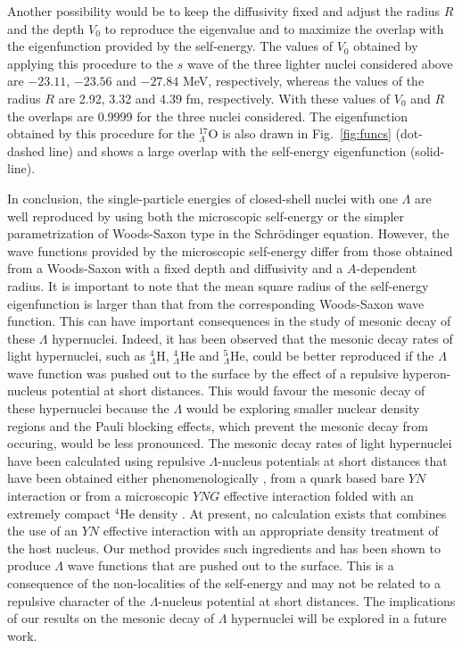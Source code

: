Another possibility would be to keep the diffusivity fixed and
adjust the radius $R$ and the depth $V_0$ to reproduce the eigenvalue and to
maximize
the overlap with the eigenfunction provided by the self-energy.  The
values of $V_0$ obtained 
by applying this procedure to the $s$ wave of the three lighter
nuclei considered 
 above are $-23.11$, $-23.56$ and $-27.84$ MeV, respectively, 
whereas the values of the radius $R$ are 2.92, 3.32 and 4.39 fm,
respectively.  With these values
of $V_0$ and $R$ the overlaps are 0.9999 for the three nuclei
considered. The eigenfunction obtained by this procedure for
 the $^{17}_{\Lambda}$O is
also drawn in Fig.\ \ref{fig:funcs} (dot-dashed line) and shows a
large overlap with the self-energy eigenfunction (solid-line).

In conclusion, the single-particle energies of closed-shell nuclei
with one $\Lambda$ are well reproduced 
by using both the microscopic self-energy or the simpler
parametrization of
 Woods-Saxon type in the Schr\"odinger equation. However, the wave
functions provided by the microscopic self-energy differ from those
obtained from a Woods-Saxon with a fixed depth and diffusivity and
a $A$-dependent radius. It is important to note that the mean square radius of the
self-energy eigenfunction is larger than that from the corresponding
Woods-Saxon wave function. This can have important consequences in 
the study of mesonic decay of these $\Lambda$ hypernuclei.
Indeed, it has been observed that the mesonic decay rates 
of light hypernuclei,
such as $^4_\Lambda$H, $^4_\Lambda$He and $^5_\Lambda$He, could be
better reproduced if the 
$\Lambda$ wave function was pushed out to the surface by the effect of
a repulsive hyperon-nucleus potential at short distances. This would   
favour the mesonic decay of these hypernuclei because the $\Lambda$ would
be exploring smaller nuclear density regions and the Pauli blocking effects,
which prevent the mesonic decay from occuring, would be less pronounced. 
The mesonic decay rates of light hypernuclei have been calculated using
repulsive 
$\Lambda$-nucleus potentials at short distances that have been obtained
either phenomenologically \cite{kuma95}, from a quark based bare $YN$
interaction \cite{straub93} or from a microscopic $YNG$ effective interaction 
folded with an extremely compact $^4$He density \cite{moto91}. At present,
no calculation exists that combines the use of an $YN$ effective interaction
with an appropriate density treatment of the host nucleus. Our method
provides such ingredients and has been shown to produce $\Lambda$ wave 
functions that are pushed out to the surface. This is a consequence of the
non-localities of the self-energy and may not be related to 
a repulsive character of the $\Lambda$-nucleus potential at short distances.
The implications of our
results on the mesonic decay of $\Lambda$ hypernuclei will be 
explored in a future work.



